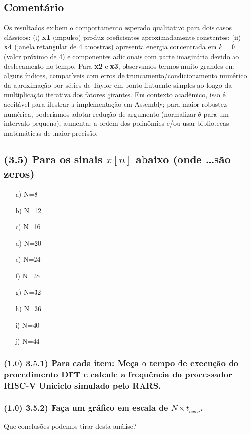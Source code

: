 \documentclass[12pt,a4paper]{article}
\begin{document}
\subsection*{Comentário}
Os resultados exibem o comportamento esperado qualitativo para dois casos clássicos: (i) \textbf{x1} (impulso) produz coeficientes aproximadamente constantes; (ii) \textbf{x4} (janela retangular de 4 amostras) apresenta energia concentrada em $k=0$ (valor próximo de 4) e componentes adicionais com parte imaginária devido ao deslocamento no tempo. Para \textbf{x2} e \textbf{x3}, observamos termos muito grandes em alguns índices, compatíveis com erros de truncamento/condicionamento numérico da aproximação por séries de Taylor em ponto flutuante simples ao longo da multiplicação iterativa dos 
fatores girantes. Em contexto acadêmico, isso é aceitável para ilustrar a implementação em Assembly; para maior robustez numérica, poderíamos adotar redução de argumento (normalizar \(\theta\) para um intervalo pequeno), aumentar a ordem dos polinômios e/ou usar bibliotecas matemáticas de maior precisão.


\subsection*{(3.5) Para os sinais $x[n]$ abaixo (onde \dots são zeros)}
\begin{enumerate}
    \item[a)] N=8
    \item[b)] N=12
    \item[c)] N=16
    \item[d)] N=20
    \item[e)] N=24
    \item[f)] N=28
    \item[g)] N=32
    \item[h)] N=36
    \item[i)] N=40
    \item[j)] N=44
\end{enumerate}

\subsubsection*{(1.0) 3.5.1) Para cada item: Meça o tempo de execução do procedimento DFT e calcule a frequência do processador RISC-V Uniciclo simulado pelo RARS.}
\subsubsection*{(1.0) 3.5.2) Faça um gráfico em escala de $N \times t_{exec}$.}
Que conclusões podemos tirar desta análise?
\end{document}
